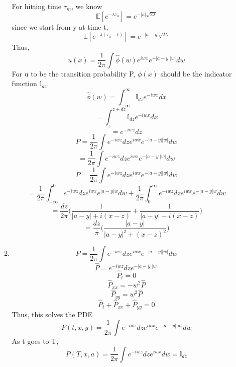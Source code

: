\documentclass[a4paper,11pt]{article}
\begin{document}
\begin{enumerate}
\begin{enumerate}
For hitting time $\tau_m$, we know
\[\mathbb{E}[e^{-\lambda\tau_a}]= e^{-|a| \sqrt{2\lambda}}\]
since we start from y at time t,
\[\mathbb{E}[e^{-\lambda(\tau_a-t)}]= e^{-|a-y| \sqrt{2\lambda}}\]
Thus,
\[u(x)= \frac{1}{2\pi}\int \hat{\phi}(w)  e^{iwx }e^{-|a-y||w|}dw \]
For u to be the transition probability P, $\phi(x)$ should be the indicator function $\mathbb{I}_{dz}$.
\[\hat{\phi}(w) = \int_{-\infty}^{\infty} \mathbb{I}_{dz} e^{-iwx} dx \]
\[= \int_{z}^{z+dz} \mathbb{I}_{dz} e^{-iwx} dx \]
\[= e^{-iwz} dz \]
\[P= \frac{1}{2\pi}\int e^{-iwz} dz  e^{iwx }e^{-|a-y||w|}dw \]
\[= \frac{1}{2\pi}\int e^{-iwz} dz  e^{iwx }e^{-|a-y||w|}dw \]
\[P= \frac{1}{2\pi}\int e^{-iwz} dz  e^{iwx }e^{-|a-y||w|}dw \]
\[= \frac{1}{2\pi}\int_{-\infty}^0 e^{-iwz} dz  e^{iwx }e^{|a-y|w}dw + \frac{1}{2\pi}\int_0^{\infty} e^{-iwz} dz  e^{iwx }e^{-|a-y|w}dw \]
\[=\frac{dz}{2\pi}\bigg(\frac{1}{|a-y|+i(x-z)}+\frac{1}{|a-y|-i(x-z)}\bigg)\]
\[=\frac{dz}{\pi}\bigg(\frac{|a-y|}{|a-y|^2+(x-z)^2}\bigg)\]
\item
\[P= \frac{1}{2\pi}\int e^{-iwz} dz  e^{iwx }e^{-|a-y||w|}dw \]
\[\hat{P}=  e^{-iwz} dz  e^{-|a-y||w|} \]
\[\hat{P}_t =0\]
\[\hat{P}_{xx}= -w^2\hat{P}\]
\[\hat{P}_{yy}= w^2\hat{P}\]
\[\hat{P}_t + \hat{P}_{xx} + \hat{P}_{yy} =0\]
Thus, this solves the PDE
\[P(t,x,y)= \frac{1}{2\pi}\int e^{-iwz} dz  e^{iwx }e^{-|a-y||w|}dw \]
As t goes to T,
\[P(T,x,a)=\frac{1}{2\pi}\int e^{-iwz} dz  e^{iwx } dw = \mathbb{I}_{dz}\]



\end{enumerate}

\end{enumerate}
\end{document}
